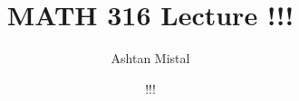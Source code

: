 \documentclass{article}
\title{MATH 316 Lecture !!!}
\author{Ashtan Mistal}
\date{!!!}
\begin{document}
\ifstandalone
\maketitle
\fi

\graphicspath{{./Lecture!!!/}}
\end{document}
